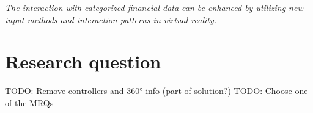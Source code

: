 \begin{framed}
	\textit{The interaction with categorized financial data can be enhanced by utilizing new input methods and interaction patterns in virtual reality.}
\end{framed}


\section{Research question}

TODO: Remove controllers and 360° info (part of solution?)
TODO: Choose one of the MRQs

\newcommand{\mrqtext}{tbd}

\newcommand{\srqonetext}{Which methods of user input in virtual reality are researched and what are their advantages and disadvantages?}
\newcommand{\srqtwotext}{Which ways of interaction for multi-dimensional data exist and what are their strengths and weaknesses?}
\newcommand{\srqthreetext}{Which traditional strategies for visualization and manipulation of 2D data have been applied and enhanced for 3D space in virtual reality?}
\newcommand{\srqfourtext}{What benefits can be achieved by bringing the interaction with categorized financial into virtual reality, compared to the traditional 2D approach?}

